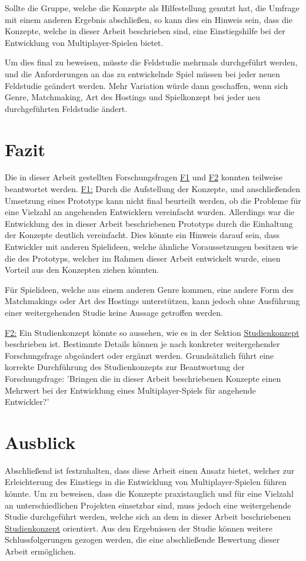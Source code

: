 Sollte die Gruppe, welche die Konzepte als Hilfestellung genutzt hat, die Umfrage mit einem anderen Ergebnis abschließen, so kann dies ein Hinweis sein, dass die Konzepte, welche in dieser Arbeit beschrieben sind, eine Einstiegshilfe bei der Entwicklung von Multiplayer-Spielen bietet.

Um dies final zu beweisen, müsste die Feldstudie mehrmals durchgeführt werden, und die Anforderungen an das zu entwickelnde Spiel müssen bei jeder neuen Feldstudie geändert werden. Mehr Variation würde dann geschaffen, wenn sich Genre, Matchmaking, Art des Hostings und Spielkonzept bei jeder neu durchgeführten Feldstudie ändert.


\section{Fazit}

Die in dieser Arbeit gestellten Forschungsfragen \hyperref[f1]{F1} und \hyperref[f2]{F2} konnten teilweise beantwortet werden.
\hyperref[f1]{F1:} Durch die Aufstellung der Konzepte, und anschließenden Umsetzung eines Prototyps kann nicht final beurteilt werden, ob die Probleme für eine Vielzahl an angehenden Entwicklern vereinfacht wurden. Allerdings war die Entwicklung des in dieser Arbeit beschriebenen Prototyps durch die Einhaltung der Konzepte deutlich vereinfacht. Dies könnte ein Hinweis darauf sein, dass Entwickler mit anderen Spielideen, welche ähnliche Voraussetzungen besitzen wie die des Prototyps, welcher im Rahmen dieser Arbeit entwickelt wurde, einen Vorteil aus den Konzepten ziehen könnten.

Für Spielideen, welche aus einem anderen Genre kommen, eine andere Form des Matchmakings oder Art des Hostings unterstützen, kann jedoch ohne Ausführung einer weitergehenden Studie keine Aussage getroffen werden.

\hyperref[f2]{F2:} Ein Studienkonzept könnte so aussehen, wie es in der Sektion \hyperref[studienkonzept]{Studienkonzept} beschrieben ist. Bestimmte Details können je nach konkreter weitergehender Forschungsfrage abgeändert oder ergänzt werden. Grundsätzlich führt eine korrekte Durchführung des Studienkonzepts zur Beantwortung der Forschungsfrage:
'Bringen die in dieser Arbeit beschriebenen Konzepte einen Mehrwert bei der Entwicklung eines Multiplayer-Spiels für angehende Entwickler?'

\section{Ausblick}

Abschließend ist festzuhalten, dass diese Arbeit einen Ansatz bietet, welcher zur Erleichterung des Einstiegs in die Entwicklung von Multiplayer-Spielen führen könnte. Um zu beweisen, dass die Konzepte praxistauglich und für eine Vielzahl an unterschiedlichen Projekten einsetzbar sind, muss jedoch eine weitergehende Studie durchgeführt werden, welche sich an dem in dieser Arbeit beschriebenen \hyperref[studienkonzept]{Studienkonzept} orientiert. Aus den Ergebnissen der Studie können weitere Schlussfolgerungen gezogen werden, die eine abschließende Bewertung dieser Arbeit ermöglichen.